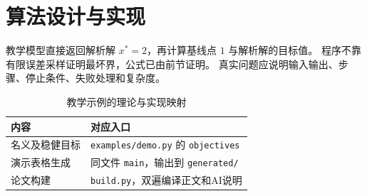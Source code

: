 \section{算法设计与实现}
教学模型直接返回解析解 $x^*=2$，再计算基线点 $1$ 与解析解的目标值。
程序不靠有限误差采样证明最坏界，公式已由前节证明。
真实问题应说明输入输出、步骤、停止条件、失败处理和复杂度。

\begin{table}[htbp]
\centering
\caption{教学示例的理论与实现映射}
\begin{tabularx}{\linewidth}{lX}
\toprule 内容 & 对应入口 \\
\midrule
名义及稳健目标 & \texttt{examples/demo.py} 的 \texttt{objectives} \\
演示表格生成 & 同文件 \texttt{main}，输出到 \texttt{generated/} \\
论文构建 & \texttt{build.py}，双遍编译正文和AI说明 \\
\bottomrule
\end{tabularx}
\end{table}
